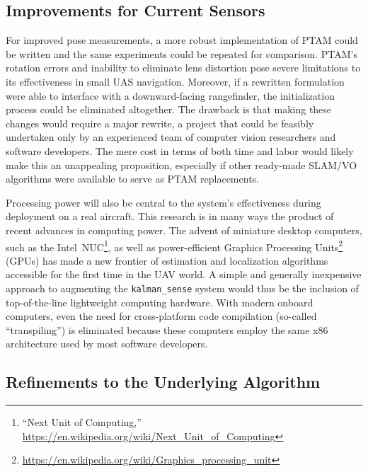 \subsection{Improvements for Current Sensors}

For improved pose measurements, a more robust implementation of PTAM could be written and the same experiments could be repeated for comparison. PTAM's rotation errors and inability to eliminate lens distortion pose severe limitations to its effectiveness in small UAS navigation. Moreover, if a rewritten formulation were able to interface with a downward-facing rangefinder, the initialization process could be eliminated altogether. The drawback is that making these changes would require a major rewrite, a project that could be feasibly undertaken only by an experienced team of computer vision researchers and software developers. The mere cost in terms of both time and labor would likely make this an unappealing proposition, especially if other ready-made SLAM/VO algorithms were available to serve as PTAM replacements.

Processing power will also be central to the system's effectiveness during deployment on a real aircraft. This research is in many ways the product of recent advances in computing power. The advent of miniature desktop computers, such as the Intel~NUC\footnote{``Next Unit of Computing,'' \url{https://en.wikipedia.org/wiki/Next_Unit_of_Computing}}, as well as power-efficient Graphics Processing Units\footnote{\url{https://en.wikipedia.org/wiki/Graphics_processing_unit}} (GPUs) has made a new frontier of estimation and localization algorithms accessible for the first time in the UAV world. A simple and generally inexpensive approach to augmenting the \texttt{kalman\_sense} system would thus be the inclusion of top-of-the-line lightweight computing hardware. With modern onboard computers, even the need for cross-platform code compilation (so-called ``transpiling'') is eliminated because these computers employ the same x86 architecture used by most software developers.

\subsection{Refinements to the Underlying Algorithm}

